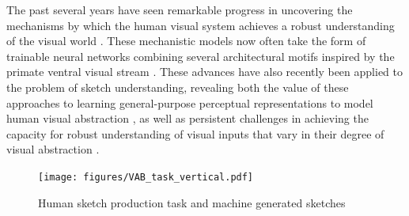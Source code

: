 \documentclass[10pt,letterpaper]{article}
\begin{document}
The past several years have seen remarkable progress in uncovering the mechanisms by which the human visual system achieves a robust understanding of the visual world \cite{yamins2014performance, kriegeskorte2015deep, zhuang2021unsupervised, konkle2022self}. 
These mechanistic models now often take the form of trainable neural networks combining several architectural motifs inspired by the primate ventral visual stream 
\cite{gross1972visual,goodale1992separate,malach2002topography,hung2005fast}. %
These advances have also recently been applied to the problem of sketch understanding, revealing both the value of these approaches to learning general-purpose perceptual representations to model human visual abstraction \cite{fan2018common, yu2017sketch, kubilius2016deep}, as well as persistent challenges in achieving the capacity for robust understanding of visual inputs that vary in their degree of visual abstraction \cite{baker2018abstract, singer2022photos, fan2020pragmatic}.

\begin{figure}[ht!]
    \centering
    \texttt{[image: figures/VAB\_task\_vertical.pdf]}
    \vspace{-1em}
    \caption{Human sketch production task and machine generated sketches
    }
    \vspace{-2em}
    \label{fig:trial}
\end{figure}
\end{document}
